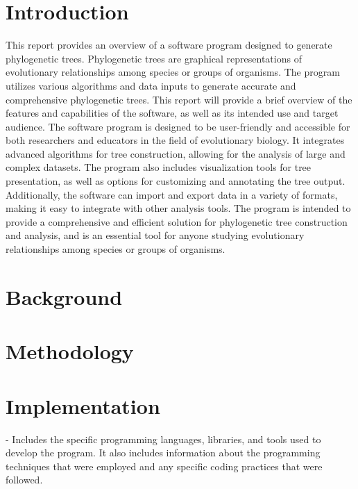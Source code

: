 \documentclass[12pt]{article}
\begin{document}

\newpage
{}

\tableofcontents

\newpage
{}

\section{Introduction}\label{sec:introducao} %
This report provides an overview of a software program designed to generate phylogenetic trees. Phylogenetic trees are graphical representations of evolutionary relationships among species or groups of organisms. The program utilizes various algorithms and data inputs to generate accurate and comprehensive phylogenetic trees. This report will provide a brief overview of the features and capabilities of the software, as well as its intended use and target audience. The software program is designed to be user-friendly and accessible for both researchers and educators in the field of evolutionary biology. It integrates advanced algorithms for tree construction, allowing for the analysis of large and complex datasets. The program also includes visualization tools for tree presentation, as well as options for customizing and annotating the tree output. Additionally, the software can import and export data in a variety of formats, making it easy to integrate with other analysis tools. The program is intended to provide a comprehensive and efficient solution for phylogenetic tree construction and analysis, and is an essential tool for anyone studying evolutionary relationships among species or groups of organisms.

\section{Background}\label{sec:desenvolvimentos}


\section{Methodology}\label{sec:desenvolvimentos}


\section{Implementation}\label{sec:desenvolvimentos}

- Includes the specific programming languages, libraries, and tools used to develop the program. It also includes information about the programming techniques that were employed and any specific coding practices that were followed. 
\end{document}

